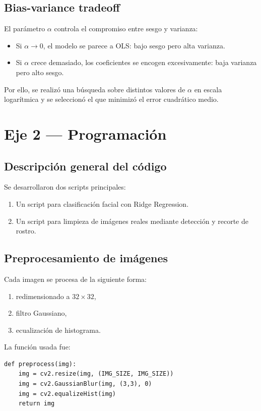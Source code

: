 \documentclass[12pt,a4paper]{article}
\begin{document}
\subsection{Bias-variance tradeoff}
El parámetro $\alpha$ controla el compromiso entre sesgo y varianza:
\begin{itemize}
    \item Si $\alpha \to 0$, el modelo se parece a OLS: bajo sesgo pero alta varianza.
    \item Si $\alpha$ crece demasiado, los coeficientes se encogen excesivamente: baja varianza pero alto sesgo.
\end{itemize}

Por ello, se realizó una búsqueda sobre distintos valores de $\alpha$ en escala logarítmica y se seleccionó el que minimizó el error cuadrático medio.

\section{Eje 2 --- Programación}

\subsection{Descripción general del código}
Se desarrollaron dos scripts principales:
\begin{enumerate}
    \item Un script para clasificación facial con Ridge Regression.
    \item Un script para limpieza de imágenes reales mediante detección y recorte de rostro.
\end{enumerate}

\subsection{Preprocesamiento de imágenes}
Cada imagen se procesa de la siguiente forma:
\begin{enumerate}
    \item redimensionado a $32\times32$,
    \item filtro Gaussiano,
    \item ecualización de histograma.
\end{enumerate}

La función usada fue:

\begin{lstlisting}
def preprocess(img):
    img = cv2.resize(img, (IMG_SIZE, IMG_SIZE))
    img = cv2.GaussianBlur(img, (3,3), 0)
    img = cv2.equalizeHist(img)
    return img
\end{lstlisting}
\end{document}
